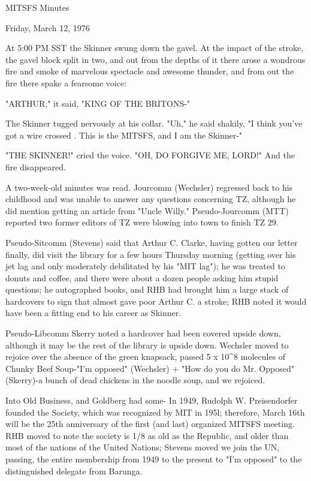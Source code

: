 \documentclass[12pt]{article}
\begin{document}
\begin{center}

MITSFS Minutes

Friday, March 12, 1976

\end{center}
 
\vspace{12pt}

\setlength{\parskip}{6pt}

\noindent
At 5:00 PM SST the Skinner swung down the gavel. At the impact of the stroke, the gavel block split in two, and out from the depths of it there arose a wondrous fire and smoke of marvelous spectacle and awesome thunder, and from out the fire there spake a fearsome voice:

"ARTHUR," it said, "KING OF THE BRITONS-"

The Skinner tugged nervously at his collar. "Uh," he said shakily, "I think you've got a wire crossed . This is the MITSFS, and I am the Skinner-"

"THE SKINNER!" cried the voice. "OH, DO FORGIVE ME, LORD!" And the fire disappeared.

A two-week-old minutes was read. Jourcomm (Wechsler) regressed back to his childhood and was unable to answer any questions concerning TZ, although he did mention getting an article from "Uncle Willy." Pseudo-Jourcomm (MTT) reported two former editors of TZ were blowing into town to finish TZ 29.

Pseudo-Sitcomm (Stevens) said that Arthur C. Clarke, having gotten our letter finally, did visit the library for a few hours Thursday morning (getting over his jet lag and only moderately debilitated by his "MIT lag"); he was treated to donuts and coffee, and there were about a dozen people asking him stupid questions; he autographed books, and RHB had brought him a large stack of hardcovers to sign that almost gave poor Arthur C. a stroke; RHB noted it would have been a fitting end to his career as Skinner.

Pseudo-Libcomm Skerry noted a hardcover had been covered upside down, although it may be the rest of the library is upside down. Wechsler moved to rejoice over the absence of the green knapsack, passed 5 x 10^8 molecules of Chunky Beef Soup-"I'm opposed" (Wechsler) + "How do you do Mr. Opposed" (Skerry)-a bunch of dead chickens in the noodle soup, and we rejoiced.

Into Old Business, and Goldberg had some- In 1949,
Rudolph W. Preisendorfer founded the Society, which was recognized by MIT in 195l; therefore, March 16th will be the 25th anniversary of the first (and last) organized MITSFS meeting. RHB moved to note the society is 1/8 as old as the Republic, and older than most of the nations of the United Nations; Stevens moved we join the UN, passing, the entire membership from 1949 to the present to "I'm opposed" to the distinguished delegate from Barunga.
\end{document}
